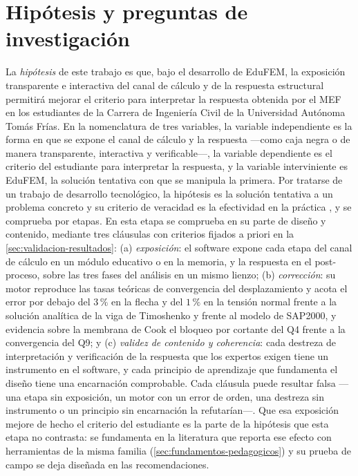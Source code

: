 \section*{Hipótesis y preguntas de investigación}

La \emph{hipótesis} de este trabajo es que, bajo el desarrollo de EduFEM, la exposición transparente e interactiva del canal de cálculo y de la respuesta estructural permitirá mejorar el criterio para interpretar la respuesta obtenida por el MEF en los estudiantes de la Carrera de Ingeniería Civil de la Universidad Autónoma Tomás Frías. En la nomenclatura de tres variables, la variable independiente es la forma en que se expone el canal de cálculo y la respuesta —como caja negra o de manera transparente, interactiva y verificable—, la variable dependiente es el criterio del estudiante para interpretar la respuesta, y la variable interviniente es EduFEM, la solución tentativa con que se manipula la primera. Por tratarse de un trabajo de desarrollo tecnológico, la hipótesis es la solución tentativa a un problema concreto y su criterio de veracidad es la efectividad en la práctica \autocite[p.~85]{garciacordoba2005tecnologica}, y se comprueba por etapas. En esta etapa se comprueba en su parte de diseño y contenido, mediante tres cláusulas con criterios fijados a priori en la \autoref{sec:validacion-resultados}: (a) \emph{exposición}: el software expone cada etapa del canal de cálculo en un módulo educativo o en la memoria, y la respuesta en el post-proceso, sobre las tres fases del análisis en un mismo lienzo; (b) \emph{corrección}: su motor reproduce las tasas teóricas de convergencia del desplazamiento y acota el error por debajo del $3\,\%$ en la flecha y del $1\,\%$ en la tensión normal frente a la solución analítica de la viga de Timoshenko y frente al modelo de SAP2000, y evidencia sobre la membrana de Cook el bloqueo por cortante del Q4 frente a la convergencia del Q9; y (c) \emph{validez de contenido y coherencia}: cada destreza de interpretación y verificación de la respuesta que los expertos exigen tiene un instrumento en el software, y cada principio de aprendizaje que fundamenta el diseño tiene una encarnación comprobable. Cada cláusula puede resultar falsa —una etapa sin exposición, un motor con un error de orden, una destreza sin instrumento o un principio sin encarnación la refutarían—. Que esa exposición mejore de hecho el criterio del estudiante es la parte de la hipótesis que esta etapa no contrasta: se fundamenta en la literatura que reporta ese efecto con herramientas de la misma familia (\autoref{sec:fundamentos-pedagogicos}) y su prueba de campo se deja diseñada en las recomendaciones.

